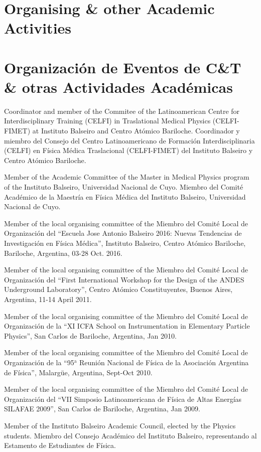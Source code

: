\ifeng
\section*{Organising \& other Academic Activities}
\else
\section*{Organización de Eventos de C\&T \& otras Actividades Académicas}
\fi

\ifeng
Coordinator and member of the Commitee of the Latinoamerican Centre for Interdisciplinary Training (CELFI) in Traslational Medical Physics (CELFI-FIMET) at Instituto Balseiro and Centro Atómico Bariloche.  
\else
Coordinador y miembro del Consejo del Centro Latinoamericano de Formación Interdisciplinaria (CELFI) en Física Médica Traslacional (CELFI-FIMET) del Instituto Balseiro y Centro Atómico Bariloche.  
\fi

\ifeng
Member of the Academic Committee of the Master in Medical Physics program of the Instituto Balseiro, Universidad Nacional de Cuyo.
\else
Miembro del Comité Académico de la Maestría en Física Médica del Instituto Balseiro, Universidad Nacional de Cuyo.
\fi

\ifeng
Member of the local organising committee of the 
\else
Miembro del Comité Local de Organización del 
\fi
``Escuela Jose Antonio Balseiro 2016: Nuevas Tendencias de Investigación en Física Médica'', Instituto Balseiro, Centro Atómico Bariloche, Bariloche, Argentina, 03-28 Oct. 2016.

\ifeng
Member of the local organising committee of the 
\else
Miembro del Comité Local de Organización del 
\fi
``First International Workshop for the Design of the ANDES Underground Laboratory'', Centro Atómico Constituyentes, Buenos Aires, Argentina, 11-14 April 2011.

\ifeng
Member of the local organising committee of the 
\else
Miembro del Comité Local de Organización de la 
\fi
``XI ICFA School on Instrumentation in Elementary Particle Physics'', San Carlos de Bariloche, Argentina, Jan 2010.

\ifeng
Member of the local organising committee of the 
\else
Miembro del Comité Local de Organización de la 
\fi
``95$^{\mathrm{a}}$ Reunión Nacional de Física de la Asociación Argentina de Física'', Malargüe, Argentina, Sept-Oct 2010.

\ifeng
Member of the local organising committee of the 
\else
Miembro del Comité Local de Organización del
\fi
``VII Simposio Latinoamericana de Física de Altas Energías SILAFAE 2009'', San Carlos de Bariloche, Argentina, Jan 2009.

\ifeng
Member of the Instituto Balseiro Academic Council, elected by the Physics students.
\else
Miembro del Consejo Académico del Instituto Balseiro, representando al Estamento de Estudiantes de Física.
\fi
